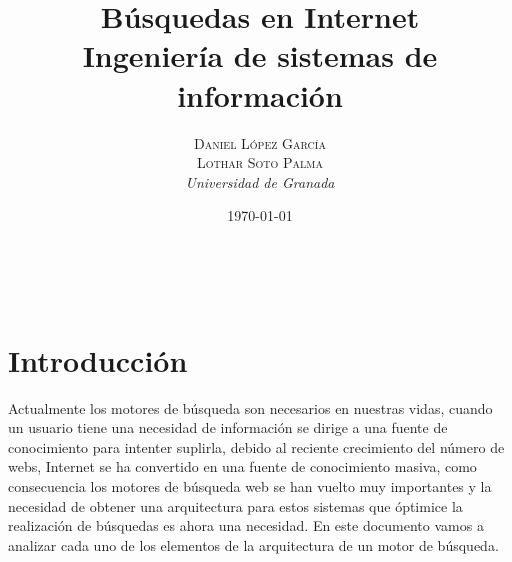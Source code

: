 \documentclass[a4paper, 11pt]{article} %
\title{\textbf{Búsquedas en Internet}\\ %
\vspace{20 pt}
Ingeniería de sistemas de información} %
\author{\textsc{Daniel López García\\
Lothar Soto Palma} %
\\{\textit{Universidad de Granada}}} %
\date{\today} %
\makeatletter
\renewcommand{\maketitle}{ %
\begin{center} %
{\Huge\@title} %
\end{center}

\vspace{20pt} %

\begin{flushright} %
{\large\@author} %
\\\@date %

\vspace{40pt} %
\end{flushright}
\renewcommand{\baselinestretch}{0.5}

}
\makeatother
\begin{document}
	\maketitle
	\tableofcontents
	\listoffigures
	\newpage

	\section{Introducción}
	Actualmente los motores de búsqueda son necesarios en nuestras vidas, cuando un usuario tiene una necesidad de información se dirige a una fuente de conocimiento para intenter suplirla, debido al reciente crecimiento del número de webs, Internet se ha convertido en una fuente de conocimiento masiva, como consecuencia los motores de búsqueda web se han vuelto muy importantes y la necesidad de obtener una arquitectura para estos sistemas que óptimice la realización de búsquedas es ahora una necesidad. En este documento vamos a analizar cada uno de los elementos de la arquitectura de un motor de búsqueda.
\end{document}
